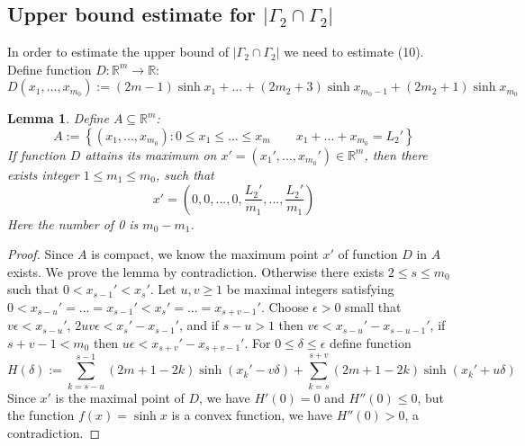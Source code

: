 \documentclass[11pt, a4paper]{article}
\newtheorem{lemma}[thm]{Lemma}
\theoremstyle{definition}
\theoremstyle{remark}
\newcommand{\abs}[1]{\left| #1 \right|}
\newcommand{\set}[1]{\left\{ #1 \right\}}
\newcommand{\bracket}[1]{\left( #1 \right)}
\begin{document}
\subsection{Upper bound estimate for $|\Gamma_2\cap\Gamma_2|$}



In order to estimate the upper bound of $\abs{\Gamma_2\cap\Gamma_2}$ we need to estimate (10). Define function $D:\mathbb{R}^m\rightarrow\mathbb{R}$:
$$D(x_1,...,x_{m_0}):=(2m-1)\sinh{x_1}+...+(2m_2+3)\sinh{x_{m_0-1}}+(2m_2+1)\sinh{x_{m_0}}$$

\begin{lemma}
Define $A\subseteq\mathbb{R}^m$:
$$A:=\set{(x_1,...,x_{m_0}): 0\leqslant x_1\leqslant...\leqslant x_m\qquad x_1+...+x_{m_0}=L_2'}$$
If function $D$ attains its maximum on $x'=(x_1',...,x_{m_0}')\in\mathbb{R}^m$, then there exists integer $1\leqslant m_1\leqslant m_0$, such that 
$$x'=\bracket{0,0,...,0,\frac{L_2'}{m_1},...,\frac{L_2'}{m_1}}$$
Here the number of 0 is $m_0-m_1$.
\end{lemma}

\begin{proof}
 Since $A$ is compact, we know the maximum point $x'$ of function $D$ in $A$ exists. We prove the lemma by contradiction. Otherwise there exists $2\leqslant s\leqslant m_0$ such that $0<x_{s-1}'<x_s'$. Let $u,v\geqslant1$ be maximal integers satisfying $0<x_{s-u}'=...=x_{s-1}'<x_s'=...=x_{s+v-1}'$. Choose $\epsilon>0$ small that $v\epsilon<x_{s-u}'$, $2uv\epsilon<x_s'-x_{s-1}'$, and if $s-u>1$ then $v\epsilon<x_{s-u}'-x_{s-u-1}'$, if $s+v-1<m_0$ then $u\epsilon<x_{s+v}'-x_{s+v-1}'$. For $0\leqslant\delta\leqslant\epsilon$ define function
$$H(\delta):=\sum_{k=s-u}^{s-1}(2m+1-2k)\sinh(x_k'-v\delta)+\sum_{k=s}^{s+v}(2m+1-2k)\sinh(x_k'+u\delta)$$
Since $x'$ is the maximal point of $D$, we have $H'(0)=0$ and $H''(0)\leqslant0$, but the function $f(x)=\sinh{x}$ is a convex function, we have $H''(0)>0$, a contradiction. 

\end{proof}
\end{document}
